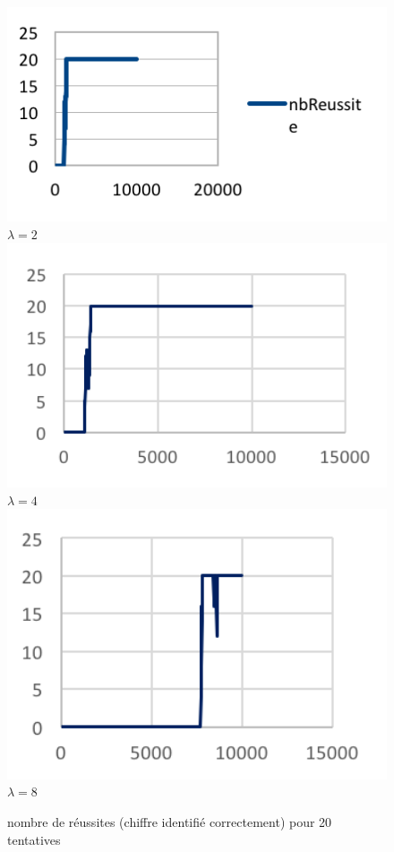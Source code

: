 \begin{figure}[h]
\begin{center}
\includegraphics[width=1\textwidth]{images/17_10_20-XOR/courbe-4.png}
\centering\\$\lambda = 2$
\endminipage\hfill
{}
\includegraphics[width=1\textwidth]{images/17_10_20-XOR/courbe-5.png}
\centering\\$\lambda = 4$
\endminipage\hfill
{}
\includegraphics[width=1\textwidth]{images/17_10_20-XOR/courbe-6.png}
\centering\\$\lambda = 8$
\endminipage\hfill
\caption{nombre de réussites (chiffre identifié correctement) pour 20 tentatives}
\end{center}
\end{figure} 

